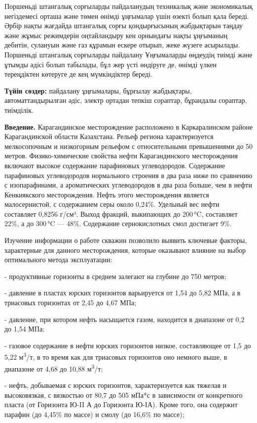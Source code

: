 Поршеньді штангалық сорғыларды пайдаланудың техникалық және экономикалық
негіздемесі орташа және төмен өнімді ұңғымалар үшін өзекті болып қала
береді. Әрбір нақты жағдайда штангалық сорғы қондырғысының жабдықтарын
таңдау және жұмыс режимдерін оңтайландыру кен орнындағы нақты ұңғыманың
дебитін, сулануын және газ құрамын ескере отырып, жеке жүзеге асырылады.
Поршеньді штангалық сорғыларды пайдалану Ұңғымаларды өңдеудің тиімді
және ұтымды әдісі болып табылады, бұл жер үсті өндіруге де, өнімді үлкен
тереңдіктен көтеруге де кең мүмкіндіктер береді.

{\bfseries Түйін сөздер:} пайдалану ұңғымалары, бұрғылау жабдықтары,
автоматтандырылған әдіс, электр ортадан тепкіш сораптар, бұрандалы
сораптар, тиімділік.

\begin{multicols}{2}
{\bfseries Введение.} Карагандинское месторождение расположено в
Каркаралинском районе Карагандинской области Казахстана. Рельеф
региона характеризуется мелкосопочным и низкогорным рельефом с
относительными превышениями до 50 метров.  Физико-химические свойства
нефти Карагандинского месторождения включают высокое содержание
парафиновых углеводородов. Содержание парафиновых углеводородов
нормального строения в два раза ниже по сравнению с изопарафинами, а
ароматических углеводородов в два раза больше, чем в нефти
Кенкиякского месторождения. Нефть этого месторождения является
малосернистой, с содержанием серы около 0,24\%. Удельный вес нефти
составляет 0,8256 г/см³. Выход фракций, выкипающих до 200 °C,
составляет 22\%, а до 300 °C — 48\%. Содержание сернокислотных смол
достигает 9\%.

Изучение информации о работе скважин позволило выявить ключевые факторы,
характерные для данного месторождения, которые оказывают влияние на
выбор оптимального метода эксплуатации:

- продуктивные горизонты в среднем залегают на глубине до 750 метров;

- давление в пластах юрских горизонтов варьируется от 1,54 до 5,82 МПа,
а в триасовых горизонтах от 2,45 до 4,67 МПа;

- давление, при котором нефть насыщается газом, находится в диапазоне от
0,2 до 1,54 МПа;

- газовое содержание в нефти юрских горизонтов низкое, составляющее от
1,5 до 5,22 м\textsuperscript{3}/т, в то время как для триасовых
горизонтов оно немного выше, в диапазоне от 4,68 до 10,88
м\textsuperscript{3}/т;

- нефть, добываемая с юрских горизонтов, характеризуется как тяжелая и
высоковязкая, с вязкостью от 80,7 до 505 мПа*с в зависимости от
конкретного пласта (от Горизонта Ю-II А до Горизонта Ю-IА). Кроме
того, она содержит парафин (до 4,45\% по массе) и смолу (до 16,6\% по
массе);


\end{multicols}
